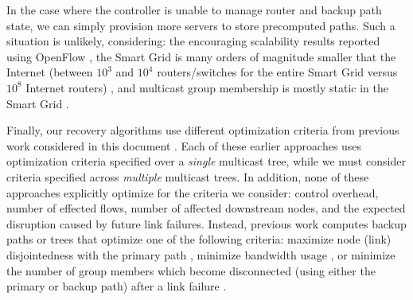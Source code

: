In the case where the controller is unable to manage router and backup path state, we can simply provision more servers to store precomputed paths.  
Such a situation is unlikely, considering: the encouraging scalability results reported using OpenFlow \cite{Openflow11}, the Smart Grid is many orders of
magnitude smaller that the Internet (between $10^3$ and $10^4$ routers/switches for the entire Smart Grid versus $10^8$ Internet routers) \cite{Bakken11}, and 
multicast group membership is mostly static in the Smart Grid \cite{Bakken11}. 

Finally, our recovery algorithms use different optimization criteria from previous work considered in this document \cite{Cui04,Fei01,Medard99,Pointurier02,Wu97}. 
Each of these earlier approaches uses optimization criteria specified over a \emph{single} multicast tree, while we must consider 
criteria specified across \emph{multiple} multicast trees.  In addition, none of these approaches explicitly optimize for the criteria we consider: control overhead, number 
of effected flows, number of affected downstream nodes, and the expected disruption caused by future link failures.
Instead, previous work computes backup paths or trees that optimize one of the following criteria: maximize node (link) disjointedness with the primary 
path \cite{Cui04,Fei01, Medard99}, minimize bandwidth usage \cite{Wu97}, or minimize the number of group members which become disconnected (using either the primary
or backup path) after a link failure \cite{Pointurier02}.




